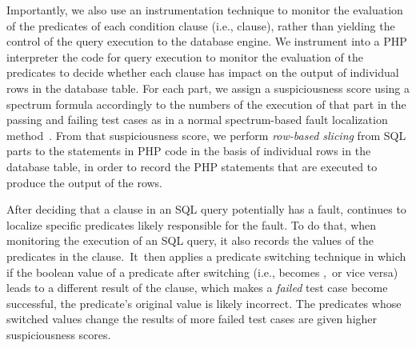 Importantly, we also use an instrumentation technique to monitor the
evaluation of the predicates of each condition clause (i.e.,
 clause), rather than yielding the control of the query
execution to the database engine.
%
We instrument into a PHP interpreter the code for query execution to
monitor the evaluation of the predicates to decide whether each
 clause has impact on the output of individual rows in the
database table. For each  part, we assign a suspiciousness
score using a spectrum formula accordingly to the numbers of the
execution of that  part in the passing and failing test
cases as in a normal spectrum-based fault localization
method~\cite{abreu-ochiai-07}. From that suspiciousness score, we
perform {\em row-based slicing} from SQL  parts to the
statements in PHP code in the basis of individual rows in the database
table, in order to record the PHP statements that are executed to
produce the output of the rows.
%

After deciding that a  clause in an SQL query potentially
has a fault, {\tool} continues to localize specific predicates likely
responsible for the fault. To do that, when monitoring 
the execution of an SQL query, it also records the values of the
predicates in the  clause.~It~then applies a predicate
switching technique in which if the boolean value of a predicate after
switching (i.e.,  becomes ,~or vice versa)
leads to a different result of the  clause, which makes a
\emph{failed} test case become successful, the predicate's original
value is likely incorrect. The predicates whose switched values
change the results of more failed test cases are given higher
suspiciousness scores.


